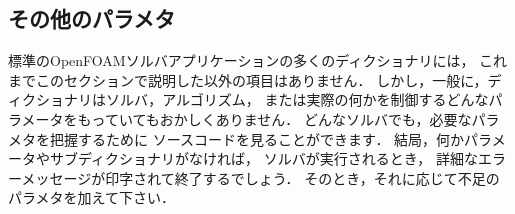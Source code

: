 \subsection{その他のパラメタ}
\label{ssec:4.5.4}
標準のOpenFOAMソルバアプリケーションの多くのディクショナリには，
これまでこのセクションで説明した以外の項目はありません．
しかし，一般に，ディクショナリはソルバ，アルゴリズム，
または実際の何かを制御するどんなパラメータをもっていてもおかしくありません．
どんなソルバでも，必要なパラメタを把握するために
ソースコードを見ることができます．
結局，何かパラメータやサブディクショナリがなければ，
ソルバが実行されるとき，
詳細なエラーメッセージが印字されて終了するでしょう．
そのとき，それに応じて不足のパラメタを加えて下さい．

